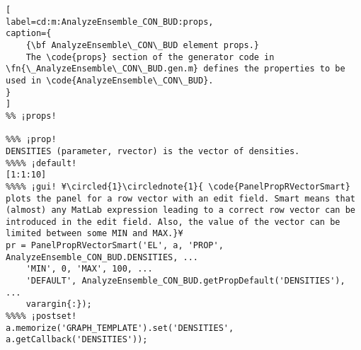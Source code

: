 \documentclass{tufte-handout}
\begin{document}
\begin{lstlisting}[
label=cd:m:AnalyzeEnsemble_CON_BUD:props,
caption={
	{\bf AnalyzeEnsemble\_CON\_BUD element props.}
	The \code{props} section of the generator code in \fn{\_AnalyzeEnsemble\_CON\_BUD.gen.m} defines the properties to be used in \code{AnalyzeEnsemble\_CON\_BUD}.
}
]
%% ¡props!

%%% ¡prop!
DENSITIES (parameter, rvector) is the vector of densities.
%%%% ¡default!
[1:1:10]
%%%% ¡gui! ¥\circled{1}\circlednote{1}{ \code{PanelPropRVectorSmart} plots the panel for a row vector with an edit field. Smart means that (almost) any MatLab expression leading to a correct row vector can be introduced in the edit field. Also, the value of the vector can be limited between some MIN and MAX.}¥
pr = PanelPropRVectorSmart('EL', a, 'PROP', AnalyzeEnsemble_CON_BUD.DENSITIES, ...
    'MIN', 0, 'MAX', 100, ...
    'DEFAULT', AnalyzeEnsemble_CON_BUD.getPropDefault('DENSITIES'), ...
    varargin{:});
%%%% ¡postset!
a.memorize('GRAPH_TEMPLATE').set('DENSITIES', a.getCallback('DENSITIES'));
\end{lstlisting}
\end{document}
